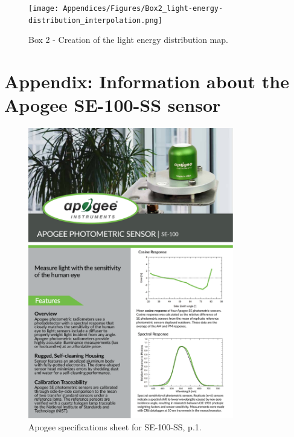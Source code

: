 \begin{appendices}
\newpage

\begin{figure}[!h]
\centering
\texttt{[image: Appendices/Figures/Box2\_light-energy-distribution\_interpolation.png]}
\caption*{Box 2 - Creation of the light energy distribution map.}
\end{figure}



\newpage
\section[\hspace{0.3cm}Information about the Apogee SE-100-SS sensor]{ Appendix: Information about the Apogee SE-100-SS sensor}
\label{app:ch4_apogee_SE-100-SS}

\begin{figure}[!h]
\centering
\includegraphics[width=0.8\textwidth]{Appendices/Apogee_SE-100-SS_spec-sheet_p1.pdf}
\caption*{Apogee specifications sheet for SE-100-SS, p.1.}
\end{figure}



\end{appendices}
